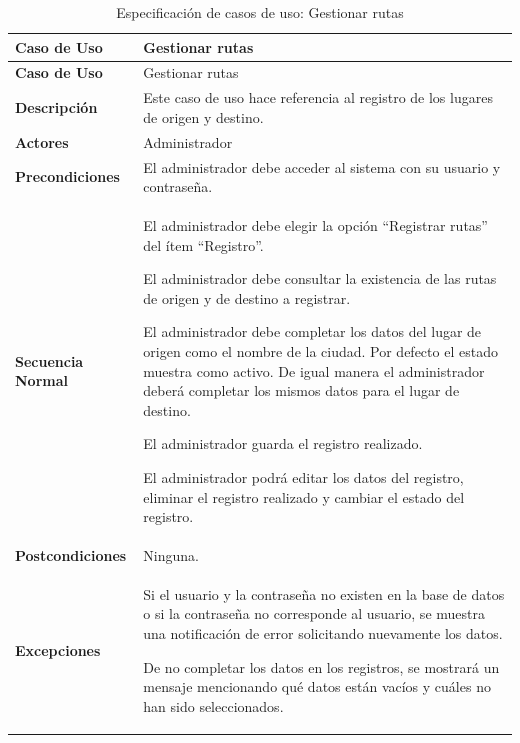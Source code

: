	\endgroup 
	\vspace{-6pt}  %
	
	\begingroup
	\onehalfspacing
	
	\begin{longtable}{m{4cm} m{10.5cm}}
		\caption[Especificación de casos de uso: Gestionar rutas]{\newline Especificación de casos de uso: Gestionar rutas} \label{tab:tabla3_4}\\
		\toprule
		\textbf{Caso de Uso} & Gestionar rutas \\
		\midrule
		\endfirsthead
		
		\toprule
		\textbf{Caso de Uso} & Gestionar rutas \\
		\endhead
		
		
		\bottomrule
		\endlastfoot
		
		\textbf{Descripción} & Este caso de uso hace referencia al registro de los lugares de origen y destino. \\ \hline
		\textbf{Actores} & Administrador \\ \hline
		\textbf{Precondiciones} & El administrador debe acceder al sistema con su usuario y contraseña. \\ \hline
		\textbf{Secuencia Normal} & El administrador debe elegir la opción “Registrar rutas” del ítem “Registro”.
		
		El administrador debe consultar la existencia de las rutas de origen y de destino a registrar.
		
		El administrador debe completar los datos del lugar de origen como el nombre de la ciudad. Por defecto el estado muestra como activo. De igual manera el administrador deberá completar los mismos datos para el lugar de destino.
		
		El administrador guarda el registro realizado.
		
		El administrador podrá editar los datos del registro, eliminar el registro realizado y cambiar el estado del registro. \\ \hline
		\textbf{Postcondiciones} & Ninguna.\\ \hline
		\textbf{Excepciones} & Si el usuario y la contraseña no existen en la base de datos o si la contraseña no corresponde al usuario, se muestra una notificación de error solicitando nuevamente los datos.
		
		De no completar los datos en los registros, se mostrará un mensaje mencionando qué datos están vacíos y cuáles no han sido seleccionados.
		
	\end{longtable}
	
